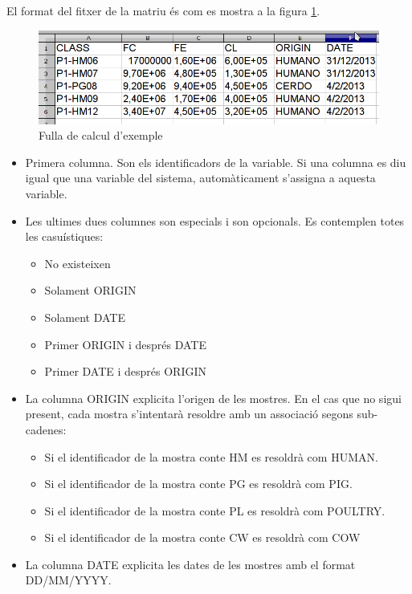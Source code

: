 El format del fitxer de la matriu \'{e}s com es mostra a la figura \ref{fig:matrixSource}.
\begin{figure}[h!]
  \centering
  \includegraphics[scale=0.5]{img/userguide/matrix_source.png}
  \caption{Fulla de calcul d'exemple}
  \label{fig:matrixSource}
\end{figure}

\begin{itemize}
\item Primera columna. Son els identificadors de la variable. Si una columna es diu igual que una variable del sistema, automàticament s'assigna a aquesta variable.
\item Les ultimes dues columnes son especials i son opcionals. Es contemplen totes les casuístiques:
\begin{itemize}
\item No existeixen
\item Solament ORIGIN
\item Solament DATE
\item Primer ORIGIN i després DATE
\item Primer DATE i després ORIGIN
\end{itemize}
\item La columna ORIGIN explicita l'origen de les mostres. En el cas que no sigui present, cada mostra s'intentar\`{a} resoldre  amb un associació segons sub-cadenes:
\begin{itemize}
\item Si el identificador de la mostra conte HM es resoldrà com HUMAN.
\item Si el identificador de la mostra conte PG es resoldrà com PIG.
\item Si el identificador de la mostra conte PL es resoldrà com POULTRY.
\item Si el identificador de la mostra conte CW es resoldrà com COW
\end{itemize}
\item La columna DATE explicita les dates de les mostres amb el format DD/MM/YYYY.
\end{itemize}

